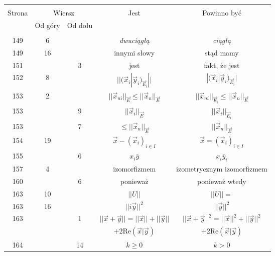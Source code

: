 \documentclass[a4paper]{article}
\begin{document}
\begin{center}
  \begin{tabular}{|c|c|c|c|c|}
    \hline
    & \multicolumn{2}{c|}{} & & \\
    Strona & \multicolumn{2}{c|}{Wiersz}& Jest & Powinno być \\ \cline{2-3}
    & Od góry & Od dołu &  &  \\ \hline
    & & & & \\
    149 & 6 & & \emph{dwuciągłą} & \emph{ciągłą} \\
    149 & 16 & & innymi słowy & stąd mamy \\
    151 & & 3 & jest & fakt, że jest \\
    152 & 8 & & $|| ( \vec{ x }_{ i } | \vec{ y }_{ i }
                )_{ \vec{ E }_{ i } } ||$
           & $| ( \vec{ x }_{ i } | \vec{ y }_{ i }
             )_{ \vec{ E }_{ i } } |$ \\
    153 & 2 & & $|| \vec{ x }_{ ni } ||_{ \vec{ E } } \leq ||
                \vec{ x }_{ n } ||_{ \vec{ E } }$
           & $|| \vec{ x }_{ ni } ||_{ \vec{ E }_{ i } } \leq ||
             \vec{ x }_{ n } ||_{ \vec{ E } }$ \\
    153 & & 9 & $|| \vec{ x }_{ i } ||_{ \vec{ E } }$
           & $|| \vec{ x }_{ i } ||_{ \vec{ E }_{ i } }$ \\
    153 & & 7 & $\leq || \vec{ x }_{ n } ||_{ \vec{ E } }$
           & $|| \vec{ x }_{ n } ||_{ \vec{ E } }$ \\
    154 & 19 & & $\vec{ x } - ( \vec{ x }_{ i } )_{ i \in I }$
           & $\vec{ x } = ( \vec{ x }_{ i } )_{ i \in I }$ \\
    155 & & 6 & $x_{ i } \bar{ y }$ & $x_{ i } \bar{ y }_{ i }$ \\
    157 & 4 & & izomorfizmem & izometrycznym izomorfizmem \\
    160 & & 6 & ponieważ & ponieważ wtedy \\
    163 & 10 & & $|| U ||$ & $|| U || =$ \\
    163 & 16 & & $|| i\vec{ y } ||^{ 2 }$ & $|| \vec{ y } ||^{ 2 }$ \\
    163 & & 1 & $|| \vec{ x } + \vec{ y } || = || \vec{ x } ||
                + || \vec{ y } ||$
           & $|| \vec{ x } + \vec{ y } ||^{ 2 } = || \vec{ x } ||^{ 2 }
             + || \vec{ y } ||^{ 2 }$ \\
    & & &  $+ 2 \mathrm{Re}( \vec{ x } | \vec{ y } )$
           & $+ 2 \mathrm{Re}( \vec{ x } | \vec{ y } )$ \\
    164 & & 14 & $k \geq 0$ & $k > 0$ \\

\end{tabular}
\end{center}
\end{document}
